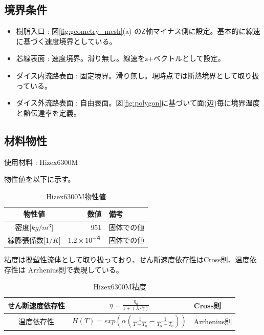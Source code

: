 \documentclass[report]{jlreq}
\begin{document}
\subsection{境界条件}

\begin{itemize}
  \item 樹脂入口 : 図\ref{fig:geometry_mesh}(a) のZ軸マイナス側に設定。基本的に線速に基づく速度境界としている。
  \item 芯線表面 : 速度境界。滑り無し。線速をz+ベクトルとして設定。
  \item ダイス内流路表面 : 固定境界。滑り無し。現時点では断熱境界として取り扱っている。
  \item ダイス外流路表面 : 自由表面。図\ref{fig:polygon}に基づいて面({\small 辺})毎に境界温度と熱伝達率を定義。
\end{itemize}

\subsection{材料物性}
使用材料 : Hizex6300M

物性値を以下に示す。
\begin{table}
\centering
\caption[Hizex6300M物性値]{Hizex6300M物性値}  
\label{Hizex6300M}
\setlength{\tabcolsep}{5pt}
\begin{tabular}{|c|r|l|}\hline
物性値 & 数値 & 備考\\ \hline
密度[$kg/m^3$] & 951 & 固体での値\\ \hline
線膨張係数[$1/K$] & $1.2\times10^{-４}$ &固体での値\\ \hline
\end{tabular}
\end{table}%

粘度は擬塑性流体として取り扱っており、せん断速度依存性はCross則、温度依存性は Arrhenius則で表現している。

\begin{table}
\centering
\caption[Hizex6300M粘度]{Hizex6300M粘度}  
\label{Hizex6300M_visco}
\setlength{\tabcolsep}{5pt}
\begin{tabular}{|c|c|l|}\hline
せん断速度依存性 & $\eta=\frac{\eta_{0}}{1+(\lambda\cdot\dot{\gamma})} $ &  Cross則\\ \hline
温度依存性 & $H(T)=exp(\alpha(\frac{1}{T-T_{0}} - \frac{1}{T_{\alpha}-T_{0}}))$ & Arrhenius則\\ \hline
\end{tabular}
\end{table}%
\end{document}

